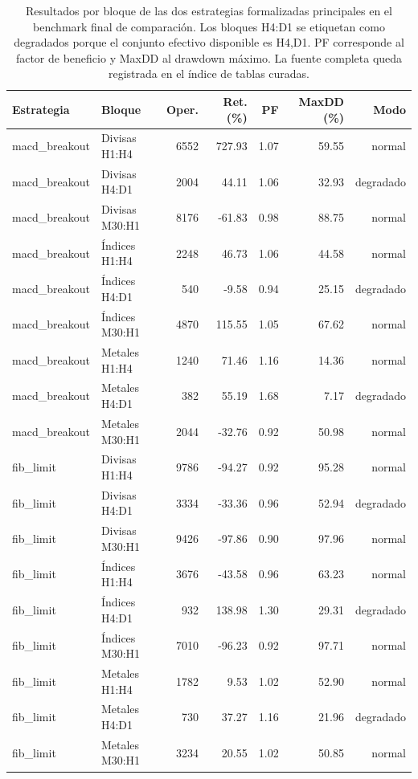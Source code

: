 \begin{table}[H]
\centering
\scriptsize
\begin{tabular}{llrrrrr}
\hline
Estrategia & Bloque & Oper. & Ret. (\%) & PF & MaxDD (\%) & Modo \\
\hline
macd\_breakout & Divisas H1:H4 & 6552 & 727.93 & 1.07 & 59.55 & normal \\
macd\_breakout & Divisas H4:D1 & 2004 & 44.11 & 1.06 & 32.93 & degradado \\
macd\_breakout & Divisas M30:H1 & 8176 & -61.83 & 0.98 & 88.75 & normal \\
macd\_breakout & \'Indices H1:H4 & 2248 & 46.73 & 1.06 & 44.58 & normal \\
macd\_breakout & \'Indices H4:D1 & 540 & -9.58 & 0.94 & 25.15 & degradado \\
macd\_breakout & \'Indices M30:H1 & 4870 & 115.55 & 1.05 & 67.62 & normal \\
macd\_breakout & Metales H1:H4 & 1240 & 71.46 & 1.16 & 14.36 & normal \\
macd\_breakout & Metales H4:D1 & 382 & 55.19 & 1.68 & 7.17 & degradado \\
macd\_breakout & Metales M30:H1 & 2044 & -32.76 & 0.92 & 50.98 & normal \\
fib\_limit & Divisas H1:H4 & 9786 & -94.27 & 0.92 & 95.28 & normal \\
fib\_limit & Divisas H4:D1 & 3334 & -33.36 & 0.96 & 52.94 & degradado \\
fib\_limit & Divisas M30:H1 & 9426 & -97.86 & 0.90 & 97.96 & normal \\
fib\_limit & \'Indices H1:H4 & 3676 & -43.58 & 0.96 & 63.23 & normal \\
fib\_limit & \'Indices H4:D1 & 932 & 138.98 & 1.30 & 29.31 & degradado \\
fib\_limit & \'Indices M30:H1 & 7010 & -96.23 & 0.92 & 97.71 & normal \\
fib\_limit & Metales H1:H4 & 1782 & 9.53 & 1.02 & 52.90 & normal \\
fib\_limit & Metales H4:D1 & 730 & 37.27 & 1.16 & 21.96 & degradado \\
fib\_limit & Metales M30:H1 & 3234 & 20.55 & 1.02 & 50.85 & normal \\
\hline
\end{tabular}
\caption[Resultados por bloque del benchmark final]{Resultados por bloque de las dos estrategias formalizadas principales en el benchmark final de comparaci\'on. Los bloques H4:D1 se etiquetan como degradados porque el conjunto efectivo disponible es H4,D1. PF corresponde al factor de beneficio y MaxDD al drawdown m\'aximo. La fuente completa queda registrada en el \'indice de tablas curadas.}
\label{tab:benchmarks-w2-bloques-seleccionados}
\end{table}
